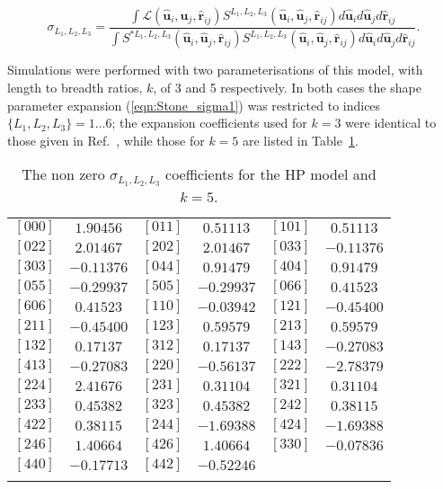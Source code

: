 \documentclass[%
reprint,
superscriptaddress,
showpacs,
 amsmath,amssymb,
 aps,
floatfix,
]{revtex4-1}
\newcommand{\vecth}[1]{ \mathbf{\hat{#1} } }
\newlength{\tabul}
\begin{document}
\begin{widetext}
\begin{equation}
\label{eqn:Stone_sigma2}
    \sigma_{L_1, L_2, L_3} = \frac
    {
    \int \mathcal{L}(\vecth{u}_i,\vecth{u}_j,\vecth{r}_{ij})S^{L_1, L_2, L_3}
    (\vecth{u}_i,\vecth{u}_j,\vecth{r}_{ij})d\vecth{u}_id\vecth{u}_jd\vecth{r}_{ij}
    }
    {
    \int S^{*L_1, L_2, L_3}(\vecth{u}_i,\vecth{u}_j,\vecth{r}_{ij})S^{L_1, L_2, L_3}
    (\vecth{u}_i,\vecth{u}_j,\vecth{r}_{ij})d\vecth{u}_id\vecth{u}_jd\vecth{r}_{ij}
    }.
\end{equation}
\end{widetext}

%
Simulations were performed with two parameterisations of this model, with length to breadth
ratios, $k$, of 3 and 5 respectively. In both cases the shape parameter expansion
(\ref{eqn:Stone_sigma1}) was restricted to indices $\{L_1, L_2, L_3\} = 1\ldots 6$; the
expansion coefficients used for $k = 3$ were identical to those given in
Ref.~\cite{Berardi_Ricci_01}, while those for $k=5$ are listed in Table~\ref{tble:HP_sigma_k5}.


\begin{table}
    \centering
    \begin{tabular}{cccccc}
    \hhline{======}
      $[000]$ & $    1.90456 $ & $[011]$ & $    0.51113 $ & $[101]$ & $    0.51113 $  \\
      $[022]$ & $    2.01467 $ & $[202]$ & $    2.01467 $ & $[033]$ & $   -0.11376 $  \\
      $[303]$ & $   -0.11376 $ & $[044]$ & $    0.91479 $ & $[404]$ & $    0.91479 $  \\
      $[055]$ & $   -0.29937 $ & $[505]$ & $   -0.29937 $ & $[066]$ & $    0.41523 $  \\
      $[606]$ & $    0.41523 $ & $[110]$ & $   -0.03942 $ & $[121]$ & $   -0.45400 $  \\
      $[211]$ & $   -0.45400 $ & $[123]$ & $    0.59579 $ & $[213]$ & $    0.59579 $  \\
      $[132]$ & $    0.17137 $ & $[312]$ & $    0.17137 $ & $[143]$ & $   -0.27083 $  \\
      $[413]$ & $   -0.27083 $ & $[220]$ & $   -0.56137 $ & $[222]$ & $   -2.78379 $ \\
      $[224]$ & $    2.41676 $ & $[231]$ & $    0.31104 $ & $[321]$ & $    0.31104 $  \\
      $[233]$ & $    0.45382 $ & $[323]$ & $    0.45382 $ & $[242]$ & $    0.38115 $  \\
      $[422]$ & $    0.38115 $ & $[244]$ & $   -1.69388 $ & $[424]$ & $   -1.69388 $  \\
      $[246]$ & $    1.40664 $ & $[426]$ & $    1.40664 $ & $[330]$ & $   -0.07836 $  \\
      $[440]$ & $   -0.17713 $ & $[442]$ & $   -0.52246 $ &    &   \\
    \hhline{======}
    \end{tabular}
    \caption{The non zero $\sigma_{L_1, L_2, L_3}$ coefficients for the HP model and $k=5$.}
    \label{tble:HP_sigma_k5}
\end{table}
\end{document}
